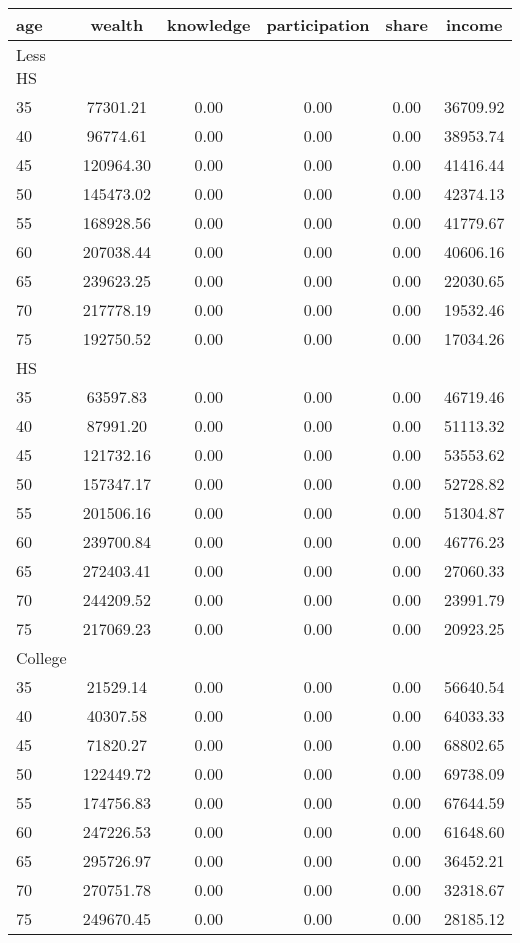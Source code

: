  \begin{tabular}{lccccc}
 \hline \hline
  age & wealth & knowledge & participation & share & income \\
 \hline
 Less HS & & & & & \\
 \hline
35 &  77301.21 &      0.00 &      0.00 &      0.00 &  36709.92 \\ 
40 &  96774.61 &      0.00 &      0.00 &      0.00 &  38953.74 \\ 
45 & 120964.30 &      0.00 &      0.00 &      0.00 &  41416.44 \\ 
50 & 145473.02 &      0.00 &      0.00 &      0.00 &  42374.13 \\ 
55 & 168928.56 &      0.00 &      0.00 &      0.00 &  41779.67 \\ 
60 & 207038.44 &      0.00 &      0.00 &      0.00 &  40606.16 \\ 
65 & 239623.25 &      0.00 &      0.00 &      0.00 &  22030.65 \\ 
70 & 217778.19 &      0.00 &      0.00 &      0.00 &  19532.46 \\ 
75 & 192750.52 &      0.00 &      0.00 &      0.00 &  17034.26 \\ 
 \hline
 HS & & & & & \\
 \hline
35 &  63597.83 &      0.00 &      0.00 &      0.00 &  46719.46 \\ 
40 &  87991.20 &      0.00 &      0.00 &      0.00 &  51113.32 \\ 
45 & 121732.16 &      0.00 &      0.00 &      0.00 &  53553.62 \\ 
50 & 157347.17 &      0.00 &      0.00 &      0.00 &  52728.82 \\ 
55 & 201506.16 &      0.00 &      0.00 &      0.00 &  51304.87 \\ 
60 & 239700.84 &      0.00 &      0.00 &      0.00 &  46776.23 \\ 
65 & 272403.41 &      0.00 &      0.00 &      0.00 &  27060.33 \\ 
70 & 244209.52 &      0.00 &      0.00 &      0.00 &  23991.79 \\ 
75 & 217069.23 &      0.00 &      0.00 &      0.00 &  20923.25 \\ 
 \hline
 College & & & & & \\
 \hline
35 &  21529.14 &      0.00 &      0.00 &      0.00 &  56640.54 \\ 
40 &  40307.58 &      0.00 &      0.00 &      0.00 &  64033.33 \\ 
45 &  71820.27 &      0.00 &      0.00 &      0.00 &  68802.65 \\ 
50 & 122449.72 &      0.00 &      0.00 &      0.00 &  69738.09 \\ 
55 & 174756.83 &      0.00 &      0.00 &      0.00 &  67644.59 \\ 
60 & 247226.53 &      0.00 &      0.00 &      0.00 &  61648.60 \\ 
65 & 295726.97 &      0.00 &      0.00 &      0.00 &  36452.21 \\ 
70 & 270751.78 &      0.00 &      0.00 &      0.00 &  32318.67 \\ 
75 & 249670.45 &      0.00 &      0.00 &      0.00 &  28185.12 \\ 
 \hline \hline
 \end{tabular}
